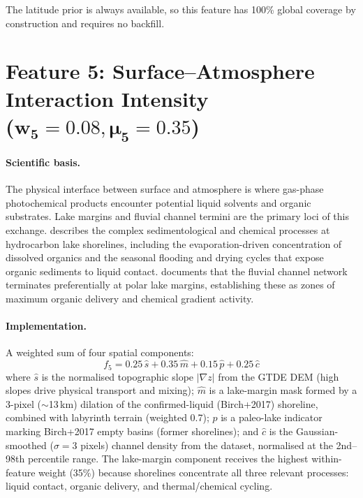 The latitude prior is always available, so this feature has 100\% global
coverage by construction and requires no backfill.

\section[Feature 5: Surface--Atmosphere Interaction Intensity
  ($w_5 = 0.08$, $\mu_5 = 0.35$)]{Feature 5: Surface--Atmosphere Interaction Intensity \\
  ($\boldsymbol{w_5 = 0.08, \mu_5 = 0.35}$)}
\label{sec:feat_sai}

\paragraph{Scientific basis.}
The physical interface between surface and atmosphere is where gas-phase
photochemical products encounter potential liquid solvents and organic
substrates.  Lake margins and fluvial channel termini are the primary loci
of this exchange.  \citet{Hayes2016} describes the complex sedimentological
and chemical processes at hydrocarbon lake shorelines, including the
evaporation-driven concentration of dissolved organics and the seasonal
flooding and drying cycles that expose organic sediments to liquid contact.
\citet{Miller2021channels} documents that the fluvial channel network
terminates preferentially at polar lake margins, establishing these as zones
of maximum organic delivery and chemical gradient activity.

\paragraph{Implementation.}
A weighted sum of four spatial components:
\begin{equation}
  f_5 = 0.25\,\hat{s} + 0.35\,\hat{m} + 0.15\,\hat{p} + 0.25\,\hat{c}
  \label{eq:feat5}
\end{equation}
where $\hat{s}$ is the normalised topographic slope $|\nabla z|$ from the
GTDE DEM (high slopes drive physical transport and mixing); $\hat{m}$ is a
lake-margin mask formed by a 3-pixel ($\sim$13\,km) dilation of the
confirmed-liquid (Birch+2017) shoreline, combined with labyrinth terrain
(weighted 0.7); $\hat{p}$ is a paleo-lake indicator marking Birch+2017 empty
basins (former shorelines); and $\hat{c}$ is the Gaussian-smoothed ($\sigma = 3$ pixels)
channel density from the \citet{Miller2021channels} dataset, normalised at the
2nd--98th percentile range.  The lake-margin component receives the highest
within-feature weight (35\%) because shorelines concentrate all three relevant
processes: liquid contact, organic delivery, and thermal/chemical cycling.

